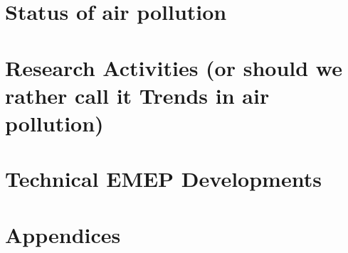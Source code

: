\documentclass[a4paper,12pt,american,draft]{book}
\begin{document}
\frontmatter 
\pagestyle{fancy}


\cleardoublepage


\tableofcontents
\cleardoublepage

\mainmatter
\pagestyle{fancy}


\part{Status of air pollution}
 
 

\part{Research Activities (or should we rather call it Trends in air pollution)} 


\part{Technical EMEP Developments}



\part{Appendices}
\setcounter{part}{1}
\cleardoublepage
\setcounter{page}{1}
\begin{appendix}
\renewcommand{\theHchapter}{\Alph{chapter}}
\renewcommand{\thepage}{{\em page \Alph{chapter}:\arabic{page}}}
\renewcommand{\thepage}{{\Alph{chapter}:\arabic{page}}}
\renewcommand{\thetable}{\Alph{chapter}:\arabic{table}}








\end{appendix}
\end{document}
